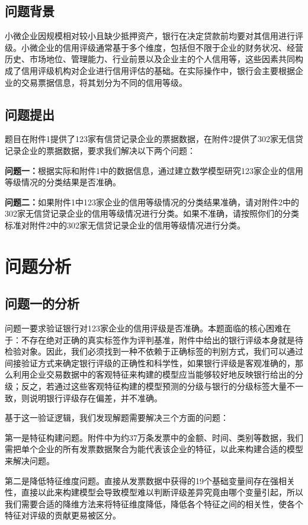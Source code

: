 \documentclass[12pt,a4paper,AutoFakeBold=2]{ctexart}
\begin{document}
\subsection{问题背景}

小微企业因规模相对较小且缺少抵押资产，银行在决定贷款前均要对其信用进行评级。小微企业的信用评级通常基于多个维度，包括但不限于企业的财务状况、经营历史、市场地位、管理能力、行业前景以及企业主的个人信用等，这些因素共同构成了信用评级机构对企业进行信用评估的基础。在实际操作中，银行会主要根据企业的交易票据信息，将其划分为不同的信用等级。
\subsection{问题提出}

题目在附件1提供了123家有信贷记录企业的票据数据，在附件2提供了302家无信贷记录企业的票据数据，要求我们解决以下两个问题：

\textbf{问题一：}根据实际和附件1中的数据信息，通过建立数学模型研究123家企业的信用等级情况的分类结果是否准确。

\textbf{问题二：}如果附件1中123家企业的信用等级情况的分类结果准确，请对附件2中的302家无信贷记录企业的信用等级情况进行分类。如果不准确，请按照你们的分类标准对附件2中的302家无信贷记录企业的信用等级情况进行分类。

\section{问题分析}


\subsection{问题一的分析}

问题一要求验证银行对123家企业的信用评级是否准确。本题面临的核心困难在于：不存在绝对正确的真实标签作为评判基准，附件中给出的银行评级本身就是待检验对象。因此，我们必须找到一种不依赖于正确标签的判别方式，我们可以通过间接验证方式来确定银行评级的正确性和科学性，如果银行评级是客观准确的，那么利用企业交易数据中的客观特征来构建的模型应当能够较好地反映银行给出的分级；反之，若通过这些客观特征构建的模型预测的分级与银行的分级标签大量不一致，则说明银行评级存在偏差，并不准确。

基于这一验证逻辑，我们发现解题需要解决三个方面的问题：

第一是特征构建问题。附件中为约37万条发票中的金额、时间、类别等数据，我们需把单个企业的所有发票数据聚合为能代表该企业的特征，以此来构建合适的模型来解决问题。

第二是降低特征维度问题。直接从发票数据中获得的19个基础变量间存在强相关性，直接以此来构建模型会导致模型难以判断评级差异究竟由哪个变量引起，所以我们需要合适的降维方法来将特征维度降低，降低各个特征之间的相关性，使各个特征对评级的贡献更易被区分。
\end{document}
